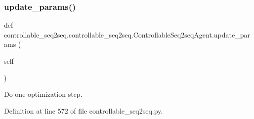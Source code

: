 \subsubsection{\texorpdfstring{update\+\_\+params()}{update\_params()}}
{\footnotesize\ttfamily def controllable\+\_\+seq2seq.\+controllable\+\_\+seq2seq.\+Controllable\+Seq2seq\+Agent.\+update\+\_\+params (\begin{DoxyParamCaption}\item[{}]{self }\end{DoxyParamCaption})}

\begin{DoxyVerb}Do one optimization step.\end{DoxyVerb}
 

Definition at line 572 of file controllable\+\_\+seq2seq.\+py.



